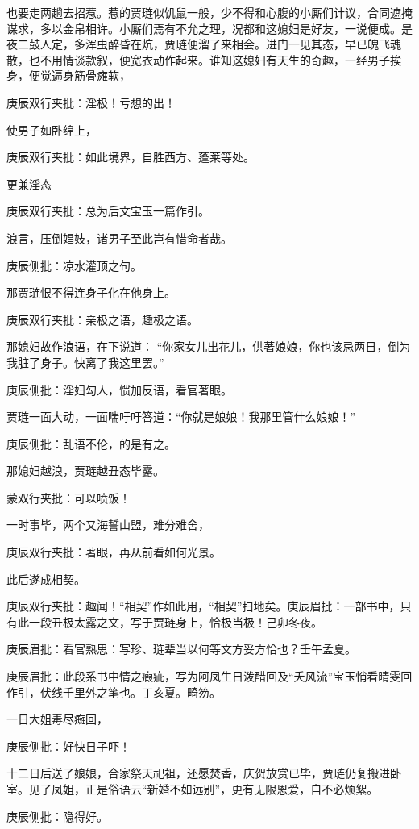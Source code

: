 \begin{parag}
也要走两趟去招惹。惹的贾琏似饥鼠一般，少不得和心腹的小厮们计议，合同遮掩谋求，多以金帛相许。小厮们焉有不允之理，况都和这媳妇是好友，一说便成。是夜二鼓人定，多浑虫醉昏在炕，贾琏便溜了来相会。进门一见其态，早已魄飞魂散，也不用情谈款叙，便宽衣动作起来。谁知这媳妇有天生的奇趣，一经男子挨身，便觉遍身筋骨瘫软，\begin{note}庚辰双行夹批：淫极！亏想的出！\end{note}使男子如卧绵上，\begin{note}庚辰双行夹批：如此境界，自胜西方、蓬莱等处。\end{note}更兼淫态\begin{note}庚辰双行夹批：总为后文宝玉一篇作引。\end{note}浪言，压倒娼妓，诸男子至此岂有惜命者哉。\begin{note}庚辰侧批：凉水灌顶之句。\end{note}那贾琏恨不得连身子化在他身上。\begin{note}庚辰双行夹批：亲极之语，趣极之语。\end{note}那媳妇故作浪语，在下说道： “你家女儿出花儿，供著娘娘，你也该忌两日，倒为我脏了身子。快离了我这里罢。”\begin{note}庚辰侧批：淫妇勾人，惯加反语，看官著眼。\end{note}贾琏一面大动，一面喘吁吁答道：“你就是娘娘！我那里管什么娘娘！”\begin{note}庚辰侧批：乱语不伦，的是有之。\end{note}那媳妇越浪，贾琏越丑态毕露。\begin{note}蒙双行夹批：可以喷饭！\end{note}一时事毕，两个又海誓山盟，难分难舍，\begin{note}庚辰双行夹批：著眼，再从前看如何光景。\end{note}此后遂成相契。\begin{note}庚辰双行夹批：趣闻！“相契”作如此用，“相契”扫地矣。庚辰眉批：一部书中，只有此一段丑极太露之文，写于贾琏身上，恰极当极！己卯冬夜。\end{note}\begin{note}庚辰眉批：看官熟思：写珍、琏辈当以何等文方妥方恰也？壬午孟夏。\end{note}\begin{note}庚辰眉批：此段系书中情之瘕疵，写为阿凤生日泼醋回及“夭风流”宝玉悄看晴雯回作引，伏线千里外之笔也。丁亥夏。畸笏。\end{note}
\end{parag}


\begin{parag}
    一日大姐毒尽癍回，\begin{note}庚辰侧批：好快日子吓！\end{note}十二日后送了娘娘，合家祭天祀祖，还愿焚香，庆贺放赏已毕，贾琏仍复搬进卧室。见了凤姐，正是俗语云“新婚不如远别”，更有无限恩爱，自不必烦絮。\begin{note}庚辰侧批：隐得好。\end{note}
\end{parag}



